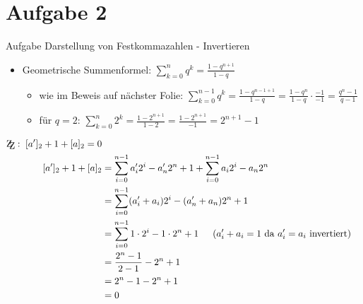 
\section{Aufgabe 2}

\setcounter{exercise}{1}

\begin{frame}[allowframebreaks]{Aufgabe \thesection}{Darstellung von Festkommazahlen - Invertieren}
  \begin{requirementsnoinc}
    \begin{itemize}
      \item \alert{Geometrische Summenformel:} $\displaystyle\sum_{k=0}^{n}q^{k}={\frac{1-q^{n+1}}{1-q}}$
      \begin{itemize}
        \item \alert{wie im Beweis auf nächster Folie}: $\displaystyle\sum_{k=0}^{n-1}q^{k}={\frac{1-q^{n-1+1}}{1-q}} = \frac{1-q^{n}}{1-q}\cdot \frac{-1}{-1} = \frac{q^n-1}{q-1} $
        \item \alert{für $q=2$:} $\displaystyle\sum_{k=0}^{n}2^{k}=\frac{1-2^{n+1}}{1-2} = \frac{1-2^{n+1}}{-1} = 2^{n+1}-1$
      \end{itemize}
    \end{itemize}
  \end{requirementsnoinc}
  \begin{solution}
    \tiny
    \begin{align*}
      \zz [a^{\prime}]_{2}+1+[a]_{2}=0\\
      [a^{\prime}]_{2}+1+[a]_{2}&=\sum_{i=0}^{n-1}a_{i}^{\prime}2^{i}-a_{n}^{\prime}2^{n}+1+\sum_{i=0}^{n-1}a_{i}2^{i}-a_{n}2^{n}\\
                                &=\sum_{i=0}^{n-1}(a_{i}^{\prime}+a_{i}){2}^{i}-(a_{n}^{\prime}+a_{n})2^{n}+1\\
                                &=\sum_{i=0}^{n-1}1\cdot2^{i}-1\cdot2^{n}+1\ \ \ \ \left(a_{i}^{\prime}+a_{i}=1\ \mathrm{da}\ a_{i}^{\prime}=a_{i}\ \mathrm{invertiert}\right)\\
                                &={{}{\frac{2^{n}-1}{2-1}}-2^{n}+1}\\
                                &={{}2^{n}-1-2^{n}+1}\\
                                &=0
    \end{align*}
  \end{solution}
\end{frame}
